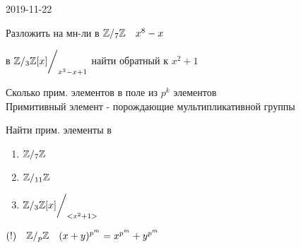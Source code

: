 \documentclass[12pt, fleqn]{article}
\begin{document}
\begin{lect}{2019-11-22}
    \begin{task}
        Разложить на мн-ли в $\mathbb{Z}/_7\mathbb{Z} \quad x^8 - x$
    \end{task}

    \begin{task}
        в $\mathbb{Z}/_3\mathbb{Z}[x]\bigg/_{x^3 - x  + 1} $ найти обратный к $x^2 + 1$
    \end{task}

    \begin{task}
        Сколько прим. элементов в поле из $p^k$ элементов\\
        Примитивный элемент - порождающие мультипликативной группы
    \end{task}

    \begin{task}
        Найти прим. элементы в 
        \begin{enumerate}
            \item $\mathbb{Z}/_7\mathbb{Z}$
            \item $\mathbb{Z}/_{11}\mathbb{Z} $
            \item $\mathbb{Z}/_3\mathbb{Z}[x] \bigg/_{<x^2 + 1>} $
        \end{enumerate}
    \end{task}

    \begin{task}
        $(!) \quad \mathbb{Z}/_p\mathbb{Z} \quad (x + y)^{p^m}  = x^{p^m} + y^{p^m} $
    \end{task}
\end{lect}
\end{document}
